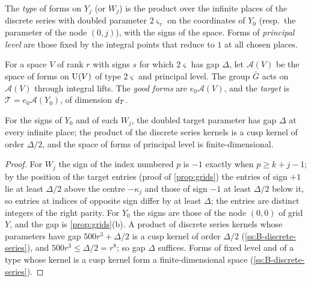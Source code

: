 The \emph{type} of forms on $Y_j$ (or $W_j$) is the product over the infinite places of the discrete
series with doubled parameter $2\varsigma_\tau$ on the coordinates of $Y_0$ (resp.\ the parameter of the
node $(0,j)$), with the signs of the space. Forms of \emph{principal level} are those fixed by the integral
points that reduce to $1$ at all chosen places.

\begin{definition}[Target]\label{def:target}
For a space $V$ of rank $r$ with signs $s$ for which $2\varsigma$ has gap $\Delta$, let $\mathcal A(V)$ be the space
of forms on $\operatorname{U}(V)$ of type $2\varsigma$ and principal level. The group $\bar G$ acts on $\mathcal A(V)$ through
integral lifts. The \emph{good forms} are $e_0\mathcal A(V)$, and the \emph{target} is $\mathcal T=e_0\mathcal
A(Y_0)$, of dimension $d_T$.
\end{definition}

\begin{proposition}\label{prop:target-finite}
For the signs of $Y_0$ and of each $W_j$, the doubled target parameter has gap $\Delta$ at every infinite
place; the product of the discrete series kernels is a cusp kernel of order $\Delta/2$, and the space of
forms of principal level is finite-dimensional.
\end{proposition}

\begin{proof}
For $W_j$ the sign of the index numbered $p$ is $-1$ exactly when $p\ge k+j-1$; by the position of the target entries (proof of \cref{prop:grids}) the entries of sign $+1$ lie at least $\Delta/2$ above the centre $-\kappa_j$ and those of sign $-1$ at least $\Delta/2$ below it, so entries at indices of opposite sign differ by at least $\Delta$; the
entries are distinct integers of the right parity. For $Y_0$ the signs are those of the node $(0,0)$ of grid $Y$, and the gap is \cref{prop:grids}(b). A product of discrete series kernels whose parameters have gap $500r^3+\Delta/2$ is a cusp kernel of order $\Delta/2$ (\cref{ss:B-discrete-series}), and $500r^3\le\Delta/2=r^8$; so gap $\Delta$
suffices. Forms of fixed level and of a type whose kernel is a cusp kernel form a finite-dimensional space (\cref{ss:B-discrete-series}).
\end{proof}

